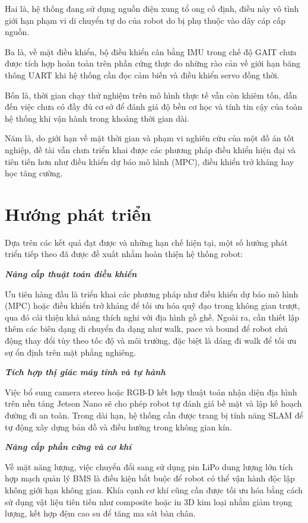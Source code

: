 Hai là, hệ thống đang sử dụng nguồn điện xung tổ ong cố định, điều này vô tình giới hạn phạm vi di chuyển tự do của robot do bị phụ thuộc vào dây cáp cấp nguồn. 

Ba là, về mặt điều khiển, bộ điều khiển cân bằng IMU trong chế độ GAIT chưa được tích hợp hoàn toàn trên phần cứng thực do những rào cản về giới hạn băng thông UART khi hệ thống cần đọc cảm biến và điều khiển servo đồng thời. 

Bốn là, thời gian chạy thử nghiệm trên mô hình thực tế vẫn còn khiêm tốn, dẫn đến việc chưa có đầy đủ cơ sở để đánh giá độ bền cơ học và tính tin cậy của toàn hệ thống khi vận hành trong khoảng thời gian dài. 

Năm là, do giới hạn về mặt thời gian và phạm vi nghiên cứu của một đồ án tốt nghiệp, đề tài vẫn chưa triển khai được các phương pháp điều khiển hiện đại và tiên tiến hơn như điều khiển dự báo mô hình (MPC), điều khiển trở kháng hay học tăng cường.

\section{Hướng phát triển}

Dựa trên các kết quả đạt được và những hạn chế hiện tại, một số hướng phát triển tiếp theo đã được đề xuất nhằm hoàn thiện hệ thống robot:

\textbf{\textit{Nâng cấp thuật toán điều khiển}} 

Ưu tiên hàng đầu là triển khai các phương pháp như điều khiển dự báo mô hình (MPC) hoặc điều khiển trở kháng để tối ưu hóa quỹ đạo trong không gian trượt, qua đó cải thiện khả năng thích nghi với địa hình gồ ghề. Ngoài ra, cần thiết lập thêm các biên dạng di chuyển đa dạng như walk, pace và bound để robot chủ động thay đổi tùy theo tốc độ và môi trường, đặc biệt là dáng đi walk để tối ưu sự ổn định trên mặt phẳng nghiêng.

\textbf{\textit{Tích hợp thị giác máy tính và tự hành}} 

Việc bổ sung camera stereo hoặc RGB-D kết hợp thuật toán nhận diện địa hình trên nền tảng Jetson Nano sẽ cho phép robot tự đánh giá bề mặt và lập kế hoạch đường đi an toàn. Trong dài hạn, hệ thống cần được trang bị tính năng SLAM để tự động xây dựng bản đồ và điều hướng trong không gian kín.

\textbf{\textit{Nâng cấp phần cứng và cơ khí}} 

Về mặt năng lượng, việc chuyển đổi sang sử dụng pin LiPo dung lượng lớn tích hợp mạch quản lý BMS là điều kiện bắt buộc để robot có thể vận hành độc lập không giới hạn không gian. Khía cạnh cơ khí cũng cần được tối ưu hóa bằng cách sử dụng vật liệu tiên tiến như composite hoặc in 3D kim loại nhằm giảm trọng lượng, kết hợp đệm cao su để tăng ma sát bàn chân.

